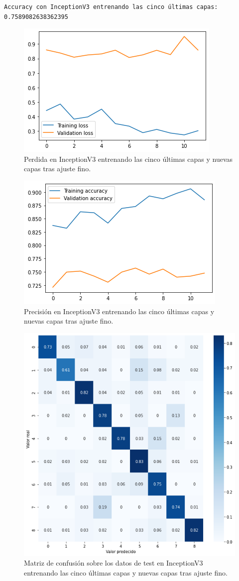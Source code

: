 \begin{lstlisting}
Accuracy con InceptionV3 entrenando las cinco últimas capas: 0.7589082638362395
\end{lstlisting}


\begin{figure}[H]
  \centering
  \includegraphics[width=0.5\linewidth]{Imagenes/entrenamiento_redes/5-ult/inception_5fine_loss.png}
  \caption{Perdida en InceptionV3 entrenando las cinco últimas capas y nuevas capas tras ajuste fino.}
\end{figure}

\begin{figure}[H]
  \centering
  \includegraphics[width=0.5\linewidth]{Imagenes/entrenamiento_redes/5-ult/inception_5fine_acc.png}
  \caption{Precisión en InceptionV3 entrenando las cinco últimas capas y nuevas capas tras ajuste fino.}
\end{figure}

\begin{figure}[H]
  \centering
  \includegraphics[width=0.5\linewidth]{Imagenes/entrenamiento_redes/5-ult/inception_5fine_matriz.png}
  \caption{Matriz de confusión sobre los datos de test en InceptionV3 entrenando las cinco últimas capas y nuevas capas tras ajuste fino.}
\end{figure}


